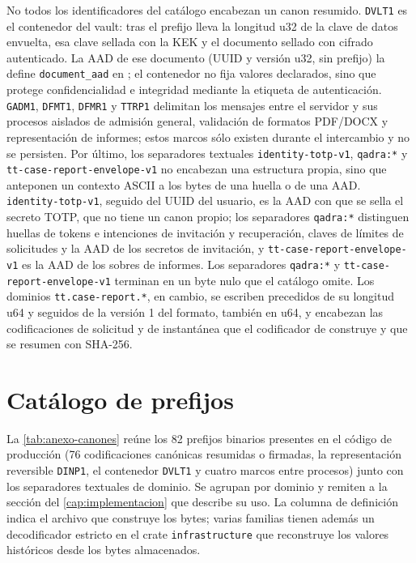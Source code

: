 No todos los identificadores del catálogo encabezan un canon resumido. \texttt{DVLT1} es el contenedor del vault: tras el prefijo lleva la longitud u32 de la clave de datos envuelta, esa clave sellada con la KEK y el documento sellado con cifrado autenticado. La AAD de ese documento (UUID y versión u32, sin prefijo) la define \texttt{document\_aad} en ; el contenedor no fija valores declarados, sino que protege confidencialidad e integridad mediante la etiqueta de autenticación. \texttt{GADM1}, \texttt{DFMT1}, \texttt{DFMR1} y \texttt{TTRP1} delimitan los mensajes entre el servidor y sus procesos aislados de admisión general, validación de formatos PDF/DOCX y representación de informes; estos marcos sólo existen durante el intercambio y no se persisten. Por último, los separadores textuales \texttt{identity-totp-v1}, \texttt{qadra:*} y \texttt{tt-case-report-envelope-v1} no encabezan una estructura propia, sino que anteponen un contexto ASCII a los bytes de una huella o de una AAD. \texttt{identity-totp-v1}, seguido del UUID del usuario, es la AAD con que se sella el secreto TOTP, que no tiene un canon propio; los separadores \texttt{qadra:*} distinguen huellas de tokens e intenciones de invitación y recuperación, claves de límites de solicitudes y la AAD de los secretos de invitación, y \texttt{tt-case-report-envelope-v1} es la AAD de los sobres de informes. Los separadores \texttt{qadra:*} y \texttt{tt-case-report-envelope-v1} terminan en un byte nulo que el catálogo omite. Los dominios \texttt{tt.case-report.*}, en cambio, se escriben precedidos de su longitud u64 y seguidos de la versión 1 del formato, también en u64, y encabezan las codificaciones de solicitud y de instantánea que el codificador de  construye y que se resumen con SHA-256.

\section{Catálogo de prefijos}\label{sec:anexo-canones-catalogo}

La \cref{tab:anexo-canones} reúne los 82 prefijos binarios presentes en el código de producción (76 codificaciones canónicas resumidas o firmadas, la representación reversible \texttt{DINP1}, el contenedor \texttt{DVLT1} y cuatro marcos entre procesos) junto con los separadores textuales de dominio. Se agrupan por dominio y remiten a la sección del \cref{cap:implementacion} que describe su uso. La columna de definición indica el archivo que construye los bytes; varias familias tienen además un decodificador estricto en el crate \texttt{infrastructure} que reconstruye los valores históricos desde los bytes almacenados.

